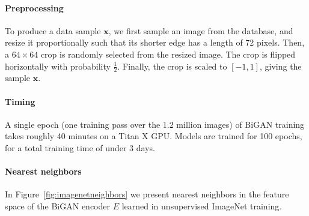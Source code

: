 \documentclass{article}
\renewcommand{\vec}[1]{\mathbf{#1}}
\newcommand{\x}{\vec{x}}
\newcommand{\reffig}[1]{Figure~\ref{fig:#1}}
\begin{document}
\begin{appendices}
\paragraph{Preprocessing}
To produce a data sample $\x$, we first sample an image from the database,
and resize it proportionally such that its shorter edge has a length of 72 pixels.
Then, a $64\times64$ crop is randomly selected from the resized image.
The crop is flipped horizontally with probability $\frac{1}{2}$.
Finally, the crop is scaled to $[-1, 1]$, giving the sample $\x$.

\paragraph{Timing}
A single epoch (one training pass over the 1.2 million images) of BiGAN training takes roughly 40 minutes on a Titan X GPU.
Models are trained for 100 epochs, for a total training time of under 3 days.

\paragraph{Nearest neighbors}
In \reffig{imagenetneighbors} we present nearest neighbors in the feature space of the BiGAN encoder $E$ learned in unsupervised ImageNet training.
\label{sec:nn_imagenet}


\end{appendices}
\end{document}
